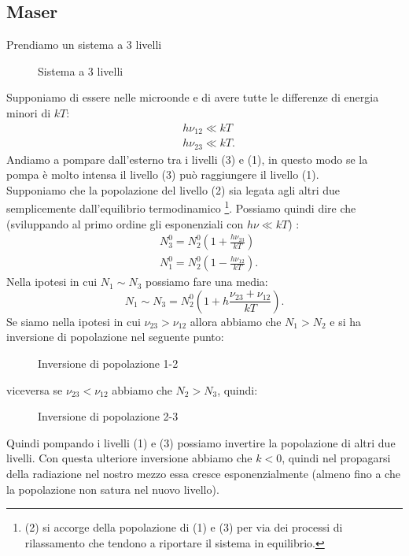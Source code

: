 \subsection{Maser}%
\label{sub:Maser}
Prendiamo un sistema a 3 livelli
\begin{figure}[ht]
    \centering
    \caption{Sistema a 3 livelli}
    \label{fig:sistema-a-3-livelli}
\end{figure}
Supponiamo di essere nelle microonde e di avere tutte le differenze di energia minori di $kT$:
\[\begin{aligned}
    &h\nu_{12}\ll kT\\
    &h\nu_{23}\ll kT
.\end{aligned}\] 
Andiamo a pompare dall'esterno tra i livelli (3) e (1), in questo modo se la pompa è molto intensa il livello (3) può raggiungere il livello (1).\\
Supponiamo che la popolazione del livello (2) sia legata agli altri due semplicemente dall'equilibrio termodinamico 
\footnote{(2) si accorge della popolazione di (1) e (3) per via dei processi di rilassamento che tendono a riportare il sistema in equilibrio.}.
Possiamo quindi dire che (sviluppando al primo ordine gli esponenziali con $h\nu\ll kT$) :
\[\begin{aligned}
    &N_3^0 = N_2^0\left(1+ \frac{h\nu_{23}}{kT}\right)\\
    &N_1^0 = N_2^0\left(1-\frac{h\nu_{12}}{kT}\right)
.\end{aligned}\]
Nella ipotesi in cui $N_1\sim N_3$ possiamo fare una media:
\[
    N_1\sim N_3 = N_2^0\left(1+ h \frac{\nu_{23}+\nu_{12}}{kT}\right)
.\] 
Se siamo nella ipotesi in cui $\nu_{23}>\nu_{12}$ allora abbiamo che $N_1>N_2$ e si ha inversione di popolazione nel seguente punto:
\begin{figure}[H]
    \centering
    \caption{Inversione di popolazione 1-2}
    \label{fig:inversione-di-popolazione-1-2}
\end{figure}
\noindent
viceversa se $\nu_{23}<\nu_{12}$ abbiamo che $N_2>N_3$, quindi:
\begin{figure}[H]
    \centering
    \caption{Inversione di popolazione 2-3}
    \label{fig:inversione-di-popolazione-2-3}
\end{figure}
\noindent
Quindi pompando i livelli (1) e (3) possiamo invertire la popolazione di altri due livelli. 
Con questa ulteriore inversione abbiamo che $k<0$, quindi nel propagarsi della radiazione nel nostro mezzo essa cresce esponenzialmente (almeno fino a che la popolazione non satura nel nuovo livello). \\
